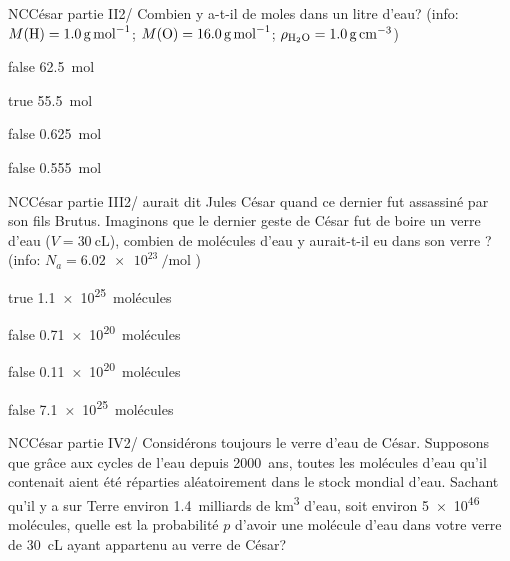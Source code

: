 \documentclass[11pt]{article}
\begin{document}
            \begin{question}{NC}{César partie II}{2}{/}
				  Combien y a-t-il de moles dans un litre d'eau? (info: 
				  $M(\ce{H}) = \SI{1.0}{\gram\per\mole}$;
				  $M(\ce{O}) = \SI{16.0}{\gram\per\mole}$;
				  $\rho_{\ce{H2O}} = \SI{1.0}{\gram\per\centi\meter\cubed}$)

            \end{question}

            \begin{reponses}
            	\item[false] \SI{62.5}{\mole}
            	\item[true]  \SI{55.5}{\mole}
                \item[false] \SI{0.625}{\mole}
                \item[false] \SI{0.555}{\mole}
            \end{reponses}
            
            \begin{question}{NC}{César partie III}{2}{/}
				  aurait dit Jules César quand ce dernier fut assassiné par son fils Brutus. Imaginons que le dernier geste de César fut de boire un verre d'eau ($V=\SI{30}{\centi\liter}$), combien de molécules d'eau y aurait-t-il eu dans son verre ? (info:  $N_a = \SI{6.02e23}{\per\mole}$ )

            \end{question}

            \begin{reponses}
            	\item[true]    \SI{1.1e25}{molécules}
            	\item[false]   \SI{.71e20}{molécules}
                \item[false]   \SI{.11e20}{molécules}
                \item[false]   \SI{7.1e25}{molécules}
            \end{reponses}
            
            
            \begin{question}{NC}{César partie IV}{2}{/}
				  Considérons toujours le verre d'eau de César. Supposons que grâce aux cycles de l’eau depuis \SI{2000}{ans}, toutes les molécules d’eau qu'il contenait aient été réparties aléatoirement dans le stock mondial d’eau.  Sachant qu'il y a sur Terre environ \num{1.4}~milliards de \si{\kilo\meter\cubed} d’eau, soit environ \num{5e46} molécules, quelle est la probabilité $p$ d'avoir une molécule d'eau dans votre verre de \SI{30}{\centi\liter} ayant appartenu au verre de César? 

            \end{question}
\end{document}
